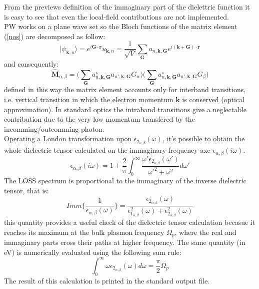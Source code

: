 \documentclass[twocolumn]{article}
\begin{document}
From the previews definition of the immaginary part of the dielettric function it is easy to see that even the local-field
contributions are not implemented.\\
PW works on a plane wave set so the Bloch functions of the matrix element (\ref{nos}) are decomposed as follow:
\begin{equation}
\vert \psi_{\textbf{k},n}\rangle=e^{i\textbf{G}\cdot\textbf{r}}u_{\textbf{k},n}=\frac{1}{\sqrt{V}}\sum_{\textbf{G}}a_{n,\textbf{k},\textbf{G}}
e^{i(\textbf{k}+\textbf{G})\cdot\textbf{r}}
\end{equation}
and consequently:
\begin{equation}
\hat{\textbf{M}}_{\alpha,\beta}=\bigg(\sum_{\textbf{G}}a^{\star}_{n,\textbf{k},\textbf{G}}a_{n',\textbf{k},\textbf{G}}
G_{\alpha}\bigg) \bigg(\sum_{\textbf{G}}a^{\star}_{n,\textbf{k},\textbf{G}}a_{n',\textbf{k},\textbf{G}}
G_{\beta}\bigg)
\end{equation}
defined in this way the matrix element accounts only for interband transitions, i.e. vertical transition in which the
electron momentum $\textbf{k}$ is conserved (optical approximation). In standard optics the intraband transitions give a 
neglectable contribution due to the very low momentum transfered by the incomming/outcomming photon.\\
Operating a London transformation upon $\epsilon_{2_{\alpha,\beta}}(\omega)$, it's possible to obtain the whole dielectric
tensor calculated on the immaginary frequency axe $\epsilon_{\alpha,\beta}(i\omega)$. 
\begin{equation}
\epsilon_{\alpha,\beta}(i\omega)=1+\frac{2}{\pi}\int_{0}^{\infty}\frac{\omega' \epsilon_{2_{\alpha,\beta}}(\omega')}
{\omega'^{2}+\omega^{2}}d\omega'
\end{equation}
The LOSS spectrum is proportional to the immaginary of the inverse dielectric tensor, that is:
\begin{equation}
Imm\Bigg\{\frac{1}{\epsilon_{\alpha,\beta}(\omega)}\Bigg\}=
\frac{\epsilon_{2_{\alpha,\beta}}(\omega)}{\epsilon_{1_{\alpha,\beta}}^{2}(\omega)+
\epsilon_{2_{\alpha,\beta}}^{2}(\omega)}
\end{equation}
this quantity provides a useful check of the dielectric tensor calculation becasue it reaches its maximum at the bulk plasmon
frequency $\Omega_{p}$, where the real and immaginary parts cross their paths at higher frequency. The same quantity (in eV)
is numerically evaluated using the following sum rule:
\begin{equation}
\int_{0}^{\infty}\omega\epsilon_{2_{\alpha,\beta}}(\omega)d\omega=\frac{\pi}{2}\Omega_{p}
\end{equation}  
The result of this calculation is printed in the standard output file.
\end{document}
